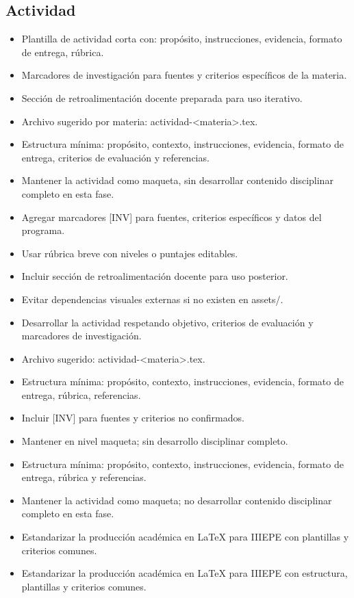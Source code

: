 \documentclass[12pt]{article}
\begin{document}
\subsection*{Actividad}
\begin{itemize}[leftmargin=*]
  \item Plantilla de actividad corta con: propósito, instrucciones, evidencia, formato de entrega, rúbrica.
  \item Marcadores de investigación para fuentes y criterios específicos de la materia.
  \item Sección de retroalimentación docente preparada para uso iterativo.
  \item Archivo sugerido por materia: actividad-<materia>.tex.
  \item Estructura mínima: propósito, contexto, instrucciones, evidencia, formato de entrega, criterios de evaluación y referencias.
  \item Mantener la actividad como maqueta, sin desarrollar contenido disciplinar completo en esta fase.
  \item Agregar marcadores [INV] para fuentes, criterios específicos y datos del programa.
  \item Usar rúbrica breve con niveles o puntajes editables.
  \item Incluir sección de retroalimentación docente para uso posterior.
  \item Evitar dependencias visuales externas si no existen en assets/.
  \item Desarrollar la actividad respetando objetivo, criterios de evaluación y marcadores de investigación.
  \item Archivo sugerido: actividad-<materia>.tex.
  \item Estructura mínima: propósito, contexto, instrucciones, evidencia, formato de entrega, rúbrica, referencias.
  \item Incluir [INV] para fuentes y criterios no confirmados.
  \item Mantener en nivel maqueta; sin desarrollo disciplinar completo.
  \item Estructura mínima: propósito, contexto, instrucciones, evidencia, formato de entrega, rúbrica y referencias.
  \item Mantener la actividad como maqueta; no desarrollar contenido disciplinar completo en esta fase.
  \item Estandarizar la producción académica en LaTeX para IIIEPE con plantillas y criterios comunes.
  \item Estandarizar la producción académica en LaTeX para IIIEPE con estructura, plantillas y criterios comunes.

\end{itemize}
\end{document}
